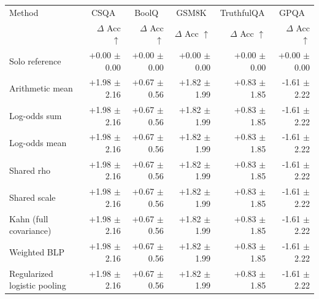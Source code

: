 \begin{tabular}{lrrrrr}
\toprule
Method & \multicolumn{1}{c}{CSQA} & \multicolumn{1}{c}{BoolQ} & \multicolumn{1}{c}{GSM8K} & \multicolumn{1}{c}{TruthfulQA} & \multicolumn{1}{c}{GPQA} \\
 & $\Delta$ Acc $\uparrow$ & $\Delta$ Acc $\uparrow$ & $\Delta$ Acc $\uparrow$ & $\Delta$ Acc $\uparrow$ & $\Delta$ Acc $\uparrow$ \\
\midrule
Solo reference & +0.00 {\scriptsize $\pm$ 0.00} & +0.00 {\scriptsize $\pm$ 0.00} & +0.00 {\scriptsize $\pm$ 0.00} & +0.00 {\scriptsize $\pm$ 0.00} & +0.00 {\scriptsize $\pm$ 0.00} \\
Arithmetic mean & +1.98 {\scriptsize $\pm$ 2.16} & +0.67 {\scriptsize $\pm$ 0.56} & +1.82 {\scriptsize $\pm$ 1.99} & +0.83 {\scriptsize $\pm$ 1.85} & -1.61 {\scriptsize $\pm$ 2.22} \\
Log-odds sum & +1.98 {\scriptsize $\pm$ 2.16} & +0.67 {\scriptsize $\pm$ 0.56} & +1.82 {\scriptsize $\pm$ 1.99} & +0.83 {\scriptsize $\pm$ 1.85} & -1.61 {\scriptsize $\pm$ 2.22} \\
Log-odds mean & +1.98 {\scriptsize $\pm$ 2.16} & +0.67 {\scriptsize $\pm$ 0.56} & +1.82 {\scriptsize $\pm$ 1.99} & +0.83 {\scriptsize $\pm$ 1.85} & -1.61 {\scriptsize $\pm$ 2.22} \\
Shared rho & +1.98 {\scriptsize $\pm$ 2.16} & +0.67 {\scriptsize $\pm$ 0.56} & +1.82 {\scriptsize $\pm$ 1.99} & +0.83 {\scriptsize $\pm$ 1.85} & -1.61 {\scriptsize $\pm$ 2.22} \\
Shared scale & +1.98 {\scriptsize $\pm$ 2.16} & +0.67 {\scriptsize $\pm$ 0.56} & +1.82 {\scriptsize $\pm$ 1.99} & +0.83 {\scriptsize $\pm$ 1.85} & -1.61 {\scriptsize $\pm$ 2.22} \\
Kahn (full covariance) & +1.98 {\scriptsize $\pm$ 2.16} & +0.67 {\scriptsize $\pm$ 0.56} & +1.82 {\scriptsize $\pm$ 1.99} & +0.83 {\scriptsize $\pm$ 1.85} & -1.61 {\scriptsize $\pm$ 2.22} \\
Weighted BLP & +1.98 {\scriptsize $\pm$ 2.16} & +0.67 {\scriptsize $\pm$ 0.56} & +1.82 {\scriptsize $\pm$ 1.99} & +0.83 {\scriptsize $\pm$ 1.85} & -1.61 {\scriptsize $\pm$ 2.22} \\
Regularized logistic pooling & +1.98 {\scriptsize $\pm$ 2.16} & +0.67 {\scriptsize $\pm$ 0.56} & +1.82 {\scriptsize $\pm$ 1.99} & +0.83 {\scriptsize $\pm$ 1.85} & -1.61 {\scriptsize $\pm$ 2.22} \\

\end{tabular}
